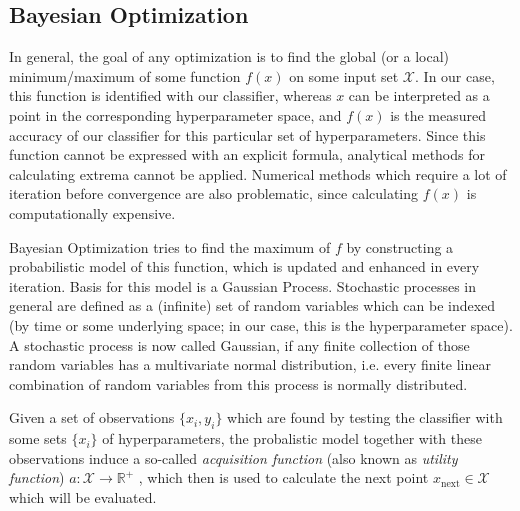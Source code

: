 \subsection{Bayesian Optimization}
In general, the goal of any optimization is to find the global (or a local) minimum/maximum of some function $f(x)$ on some input set $\mathcal{X}$. In our case, this function is identified with our classifier, whereas $x$ can be interpreted as a point in the corresponding hyperparameter space, and $f(x)$ is the measured accuracy of our classifier for this particular set of hyperparameters. Since this function cannot be expressed with an explicit formula, analytical methods for calculating extrema cannot be applied. Numerical methods which require a lot of iteration before convergence are also problematic, since calculating $f(x)$ is computationally expensive. \par
Bayesian Optimization tries to find the maximum of $f$ by constructing a probabilistic model of this function, which is updated and enhanced in every iteration. Basis for this model is a Gaussian Process. Stochastic processes in general are defined as a (infinite) set of random variables which can be indexed (by time or some underlying space; in our case, this is the hyperparameter space). A stochastic process is now called Gaussian, if any finite collection of those random variables has a multivariate normal distribution, i.e. every finite linear combination of random variables from this process is normally distributed. \par
Given a set of observations $\{x_i,y_i\}$ which are found by testing the classifier with some sets $\{x_i\}$ of hyperparameters, the probalistic model together with these observations induce a so-called \emph{acquisition function} (also known as \emph{utility function}) $a: \mathcal{X} \rightarrow \mathbb{R}^+$ , which then is used to calculate the next point $x_{\text{next}} \in \mathcal{X}$ which will be evaluated. \cite{snoek2012practical}

